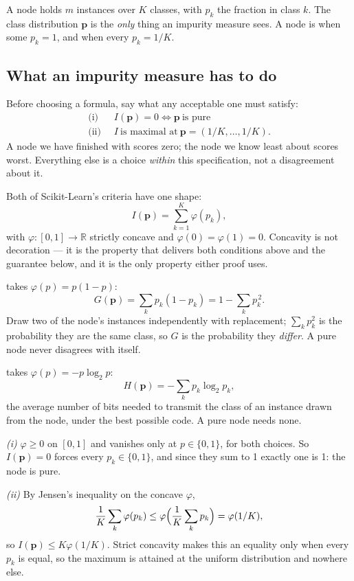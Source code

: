 \documentclass[11pt,a4paper]{article}
\begin{document}
A node holds $m$ instances over $K$ classes, with $p_k$ the fraction in class
$k$. The class distribution $\mathbf{p}$ is the \emph{only} thing an impurity
measure sees. A node is  when some $p_k = 1$, and 
when every $p_k = 1/K$.

\subsection{What an impurity measure has to do}

Before choosing a formula, say what any acceptable one must satisfy:
\[
\begin{aligned}
\text{(i)}\;\; & I(\mathbf{p}) = 0 \iff \mathbf{p}\ \text{is pure} \\
\text{(ii)}\;\; & I\ \text{is maximal at}\ \mathbf{p} = (1/K,\dots,1/K).
\end{aligned}
\]
A node we have finished with scores zero; the node we know least about scores
worst. Everything else is a choice \emph{within} this specification, not a
disagreement about it.

Both of Scikit-Learn's criteria have one shape:
\[ I(\mathbf{p}) = \sum_{k=1}^{K}\varphi(p_k), \]
with $\varphi:[0,1]\to\mathbb{R}$ strictly concave and
$\varphi(0)=\varphi(1)=0$. Concavity is not decoration --- it is the property
that delivers both conditions above and the guarantee below, and it is the only
property either proof uses.

 takes $\varphi(p) = p(1-p)$:
\[ G(\mathbf{p}) = \sum_k p_k(1-p_k) = 1 - \sum_k p_k^{\,2}. \]
Draw two of the node's instances independently with replacement;
$\sum_k p_k^2$ is the probability they are the same class, so $G$ is the
probability they \emph{differ}. A pure node never disagrees with itself.

 takes $\varphi(p) = -p\log_2 p$:
\[ H(\mathbf{p}) = -\sum_k p_k\log_2 p_k, \]
the average number of bits needed to transmit the class of an instance drawn
from the node, under the best possible code. A pure node needs none.

\begin{derivbox}[title={Both satisfy the specification}]
\emph{(i)} $\varphi \ge 0$ on $[0,1]$ and vanishes only at $p \in \{0,1\}$, for
both choices. So $I(\mathbf{p}) = 0$ forces every $p_k \in \{0,1\}$, and since
they sum to 1 exactly one is 1: the node is pure.

\emph{(ii)} By Jensen's inequality on the concave $\varphi$,
\[ \frac{1}{K}\sum_k\varphi(p_k)
   \le \varphi\Bigl(\frac{1}{K}\sum_k p_k\Bigr) = \varphi(1/K), \]
so $I(\mathbf{p}) \le K\varphi(1/K)$. Strict concavity makes this an equality
only when every $p_k$ is equal, so the maximum is attained at the uniform
distribution and nowhere else.
\end{derivbox}
\end{document}
